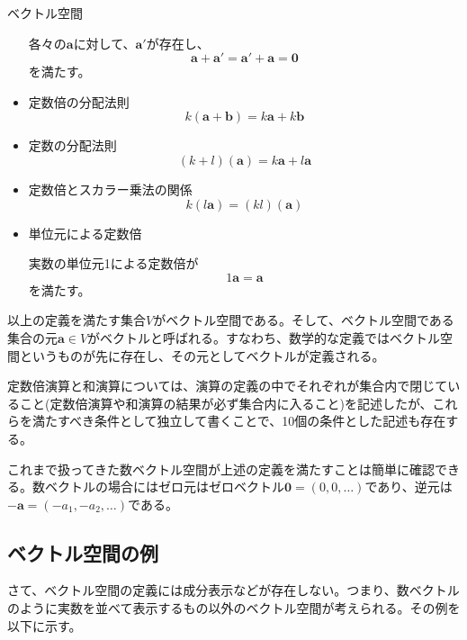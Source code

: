 \begin{definition*}{ベクトル空間}
\begin{itemize}
		      各々の\(\boldsymbol{a}\)に対して、\(\boldsymbol{a}'\)が存在し、
		      \begin{equation}
			      \boldsymbol{a}+\boldsymbol{a}'=
			      \boldsymbol{a}'+\boldsymbol{a}=\boldsymbol{0}
		      \end{equation}
		      を満たす。

		\item 定数倍の分配法則
		      \begin{equation}
			      k(\boldsymbol{a}+\boldsymbol{b})=
			      k\boldsymbol{a}+k\boldsymbol{b}
		      \end{equation}

		\item 定数の分配法則
		      \begin{equation}
			      (k+l)(\boldsymbol{a})=
			      k\boldsymbol{a}+l\boldsymbol{a}
		      \end{equation}

		\item 定数倍とスカラー乗法の関係
		      \begin{equation}
			      k(l\boldsymbol{a})=(kl)(\boldsymbol{a})
		      \end{equation}

		\item 単位元による定数倍

		      実数の単位元1による定数倍が
		      \begin{equation}
			      1\boldsymbol{a}=\boldsymbol{a}
		      \end{equation}
		      を満たす。
	\end{itemize}

\end{definition*}

以上の定義を満たす集合\(V\)がベクトル空間である。そして、ベクトル空間である集合の元\(\boldsymbol{a}\in V\)がベクトルと呼ばれる。すなわち、数学的な定義ではベクトル空間というものが先に存在し、その元としてベクトルが定義される。

定数倍演算と和演算については、演算の定義の中でそれぞれが集合内で閉じていること(定数倍演算や和演算の結果が必ず集合内に入ること)を記述したが、これらを満たすべき条件として独立して書くことで、10個の条件とした記述も存在する。

これまで扱ってきた数ベクトル空間が上述の定義を満たすことは簡単に確認できる。数ベクトルの場合にはゼロ元はゼロベクトル\(\boldsymbol{0}=(0,0,\dots)\)であり、逆元は\(-\boldsymbol{a}=(-a_1,-a_2,\dots)\)である。

\subsection{ベクトル空間の例}
さて、ベクトル空間の定義には成分表示などが存在しない。つまり、数ベクトルのように実数を並べて表示するもの以外のベクトル空間が考えられる。その例を以下に示す。

